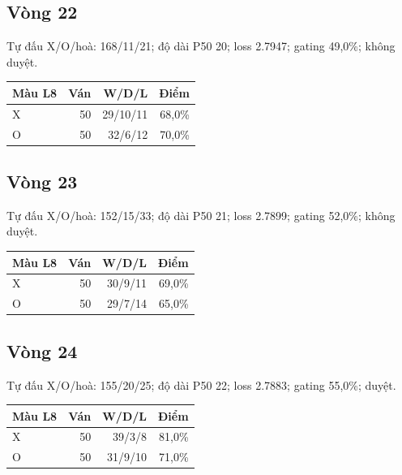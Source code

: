 \subsection*{Vòng 22}

Tự đấu X/O/hoà: 168/11/21; độ dài P50 20; loss 2.7947; gating 49,0\%; không duyệt.

\begin{center}\scriptsize\begin{tabular}{@{}lrrr@{}}\toprule

Màu L8 & Ván & W/D/L & Điểm \\

\midrule

X & 50 & 29/10/11 & 68,0\% \\

O & 50 & 32/6/12 & 70,0\% \\

\bottomrule\end{tabular}\end{center}

\subsection*{Vòng 23}

Tự đấu X/O/hoà: 152/15/33; độ dài P50 21; loss 2.7899; gating 52,0\%; không duyệt.

\begin{center}\scriptsize\begin{tabular}{@{}lrrr@{}}\toprule

Màu L8 & Ván & W/D/L & Điểm \\

\midrule

X & 50 & 30/9/11 & 69,0\% \\

O & 50 & 29/7/14 & 65,0\% \\

\bottomrule\end{tabular}\end{center}

\subsection*{Vòng 24}

Tự đấu X/O/hoà: 155/20/25; độ dài P50 22; loss 2.7883; gating 55,0\%; duyệt.

\begin{center}\scriptsize\begin{tabular}{@{}lrrr@{}}\toprule

Màu L8 & Ván & W/D/L & Điểm \\

\midrule

X & 50 & 39/3/8 & 81,0\% \\

O & 50 & 31/9/10 & 71,0\% \\

\bottomrule\end{tabular}\end{center}


